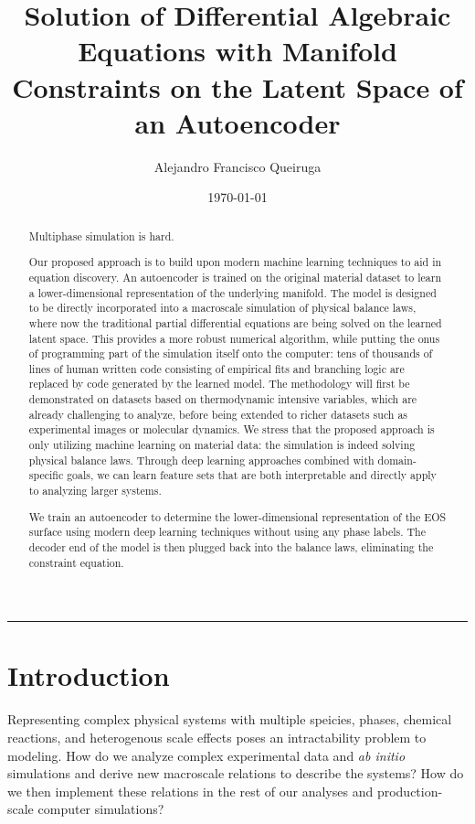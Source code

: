 \documentclass[]{article}
\title{Solution of Differential Algebraic Equations with Manifold Constraints
on the Latent Space of an Autoencoder}
\author{Alejandro Francisco Queiruga}
\date{\today}
\begin{document}
\maketitle
\begin{abstract}
Multiphase simulation is hard.
  
Our proposed approach is to build upon modern machine learning
techniques to aid in equation discovery. An autoencoder is trained on
the original material dataset to learn a lower-dimensional
representation of the underlying manifold. The model is designed to be
directly incorporated into a macroscale simulation of physical balance
laws, where now the traditional partial differential equations are being
solved on the learned latent space. This provides a more robust
numerical algorithm, while putting the onus of programming part of the
simulation itself onto the computer: tens of thousands of lines of human
written code consisting of empirical fits and branching logic are
replaced by code generated by the learned model. The methodology will
first be demonstrated on datasets based on thermodynamic intensive
variables, which are already challenging to analyze, before being
extended to richer datasets such as experimental images or molecular
dynamics. We stress that the proposed approach is only utilizing machine
learning on material data: the simulation is indeed solving physical
balance laws. Through deep learning approaches combined with
domain-specific goals, we can learn feature sets that are both
interpretable and directly apply to analyzing larger systems.
  
We train an autoencoder to determine the lower-dimensional
representation of the EOS surface using modern deep learning techniques
without using any phase labels. The decoder end of the model is then
plugged back into the balance laws, eliminating the constraint equation.
\end{abstract}

\begin{center}\rule{0.5\linewidth}{\linethickness}\end{center}

\hypertarget{header-n3216}{%
\section{Introduction}\label{header-n3216}}

Representing complex physical systems with multiple speicies, phases,
chemical reactions, and heterogenous scale effects poses an
intractability problem to modeling. How do we analyze complex
experimental data and \emph{ab initio} simulations and derive new
macroscale relations to describe the systems? How do we then implement
these relations in the rest of our analyses and production-scale
computer simulations?
\end{document}
